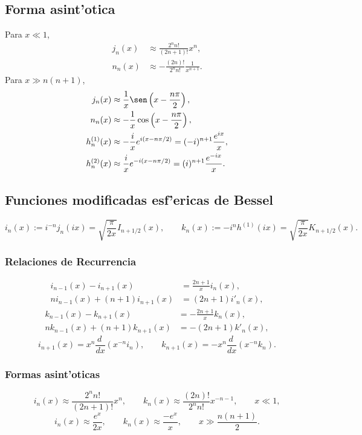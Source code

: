 \subsection{Forma asint'otica}
Para $x\ll 1$,
\begin{align}
j_n(x) &\approx \frac{2^nn!}{(2n+1)!}x^n, \\
n_n(x) &\approx -\frac{(2n)!}{2^nn!}\frac{1}{x^{n+1}}.
\end{align}
Para $x\gg n(n+1)$,
\begin{align}
j_n(x) &\approx \frac{1}{x}\sen\left(x-\frac{n\pi}{2}\right), \\
n_n(x) &\approx -\frac{1}{x}\cos\left(x-\frac{n\pi}{2}\right), \\
h^{(1)}_n(x) &\approx -\frac{i}{x}e^{i(x-{n\pi}/{2})}=(-i)^{n+1}\frac{e^{ix}}{x}, \\
h^{(2)}_n(x) &\approx \frac{i}{x}e^{-i(x-{n\pi}/{2})}=(i)^{n+1}\frac{e^{-ix}}{x}.
\end{align}

\subsection{Funciones modificadas esf'ericas de Bessel}
\begin{equation}
i_n(x):=i^{-n}j_n(ix)=\sqrt{\frac{\pi}{2x}}I_{n+1/2}(x), \qquad 
k_n(x):=-i^{n}h^{(1)}(ix)=\sqrt{\frac{\pi}{2x}}K_{n+1/2}(x).
\end{equation}

\subsubsection{Relaciones de Recurrencia}
\begin{align}
i_{n-1}(x)-i_{n+1}(x) &= \frac{2n+1}{x}i_n(x),  \\
ni_{n-1}(x)+(n+1)i_{n+1}(x) &= (2n+1)i'_n(x),
\end{align}
\begin{align}
k_{n-1}(x)-k_{n+1}(x) &= -\frac{2n+1}{x}k_n(x),\\
nk_{n-1}(x)+(n+1)k_{n+1}(x) &= -(2n+1)k'_n(x),
\end{align}
\begin{equation}
i_{n+1}(x)=x^n\frac{d\ }{dx}(x^{-n}i_n), \qquad k_{n+1}(x)=-x^n\frac{d\ }{dx}(x^{-n}k_n).
\end{equation}


\subsubsection{Formas asint'oticas}
\begin{equation}
i_n(x)\approx\frac{2^nn!}{(2n+1)!}x^n, \qquad k_n(x)\approx\frac{(2n)!}{2^nn!}x^{-n-1}, \qquad x\ll 1,
\end{equation}
\begin{equation}
i_n(x)\approx \frac{e^x}{2x}, \qquad k_n(x)\approx \frac{-e^x}{x}, \qquad x\gg \frac{n(n+1)}{2}.
\end{equation}


